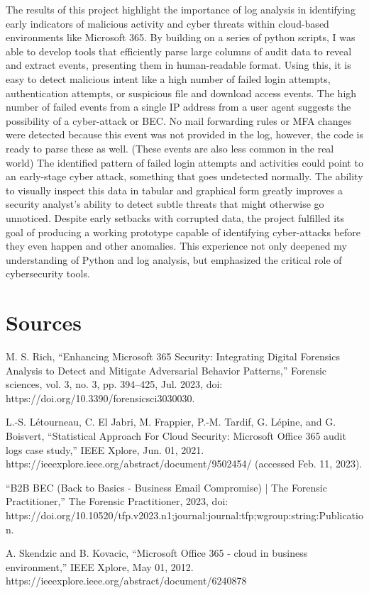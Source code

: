 \documentclass[12pt]{article}
\begin{document}
The results of this project highlight the importance of log analysis in identifying early indicators of malicious activity and cyber threats within cloud-based environments like Microsoft 365. By building on a series of python scripts, I was able to develop tools that efficiently parse large columns of audit data to reveal and extract events, presenting them in human-readable format. Using this, it is easy to detect malicious intent like a high number of failed login attempts, authentication attempts, or suspicious file and download access events. The high number of failed events from a single IP address from a user agent suggests the possibility of a cyber-attack or BEC. No mail forwarding rules or MFA changes were detected because this event was not provided in the log, however, the code is ready to parse these as well. (These events are also less common in the real world) The identified pattern of failed login attempts and activities could point to an early-stage cyber attack, something that goes undetected normally. The ability to visually inspect this data in tabular and graphical form greatly improves a security analyst’s ability to detect subtle threats that might otherwise go unnoticed. 
Despite early setbacks with corrupted data, the project fulfilled its goal of producing a working prototype capable of identifying cyber-attacks before they even happen and other anomalies. This experience not only deepened my understanding of Python and log analysis, but emphasized the critical role of cybersecurity tools.

\section{Sources}
\begin{thebibliography}{9}

M. S. Rich, “Enhancing Microsoft 365 Security: Integrating Digital Forensics Analysis to Detect and Mitigate Adversarial Behavior Patterns,” Forensic sciences, vol. 3, no. 3, pp. 394–425, Jul. 2023, doi: https://doi.org/10.3390/forensicsci3030030.



L.-S. Létourneau, C. El Jabri, M. Frappier, P.-M. Tardif, G. Lépine, and G. Boisvert, “Statistical Approach For Cloud Security: Microsoft Office 365 audit logs case study,” IEEE Xplore, Jun. 01, 2021. https://ieeexplore.ieee.org/abstract/document/9502454/ (accessed Feb. 11, 2023).


“B2B BEC (Back to Basics - Business Email Compromise) | The Forensic Practitioner,” The Forensic Practitioner, 2023, doi: https://doi.org/10.10520/tfp.v2023.n1;journal:journal:tfp;wgroup:string:Publication.


A. Skendzic and B. Kovacic, “Microsoft Office 365 - cloud in business environment,” IEEE Xplore, May 01, 2012. https://ieeexplore.ieee.org/abstract/document/6240878


\end{thebibliography}

‌

‌
\end{document}
